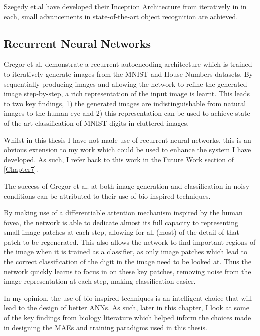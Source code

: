 Szegedy et.al have developed their Inception Architecture from \cite{szegedy2015going} iteratively in \cite{szegedy2016rethinking, szegedy2017inception} in each, small advancements in state-of-the-art object recognition are achieved.

\subsection{Recurrent Neural Networks}
Gregor et al. \cite{gregor2015draw} demonstrate a recurrent autoencoding architecture which is trained to iteratively generate images from the MNIST \cite{lecun1998mnist} and House Numbers \cite{netzer2011reading} datasets. By sequentially producing images and allowing the network to refine the generated image step-by-step, a rich representation of the input image is learnt. This leads to two key findings, 1) the generated images are indistinguishable from natural images to the human eye and 2) this representation can be used to achieve state of the art classification of MNIST digits in cluttered images.

Whilst in this thesis I have not made use of recurrent neural networks, this is an obvious extension to my work which could be used to enhance the system I have developed. As such, I refer back to this work in the Future Work section of \autoref{Chapter7}.

The success of Gregor et al. at both image generation and classification in noisy conditions can be attributed to their use of bio-inspired techniques.

By making use of a differentiable attention mechanism inspired by the human fovea, the network is able to dedicate almost its full capacity to representing small image patches at each step, allowing for all (most) of the detail of that patch to be regenerated. This also allows the network to find important regions of the image when it is trained as a classifier, as only image patches which lead to the correct classification of the digit in the image need to be looked at. Thus the network quickly learns to focus in on these key patches, removing noise from the image representation at each step, making classification easier.

In my opinion, the use of bio-inspired techniques is an intelligent choice that will lead to the design of better \acp{ANN}. As such, later in this chapter, I look at some of the key findings from biology literature which helped inform the choices made in designing the \acp{MAE} and training paradigms used in this thesis.



